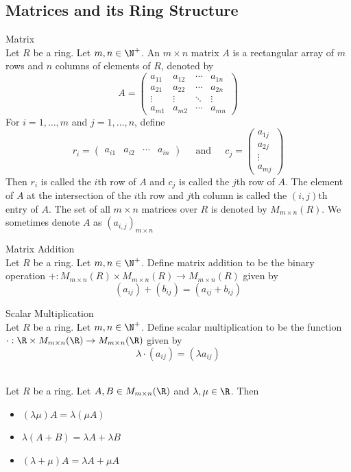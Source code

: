 \documentclass[a4paper]{article}
\begin{document}
\subsection{Matrices and its Ring Structure}
\begin{defn}{Matrix}{}\\
Let $R$ be a ring. Let $m,n\in\N^+$. An $m\times n$ matrix $A$ is a rectangular array of $m$ rows and $n$ columns of elements of $R$, denoted by $$A=
\begin{pmatrix}
a_{11}&a_{12}&\cdots&a_{1n}\\
a_{21}&a_{22}&\cdots&a_{2n}\\
\vdots&\vdots&\ddots&\vdots\\
a_{m1}&a_{m2}&\cdots&a_{mn}
\end{pmatrix}$$ For $i=1,\dots,m$ and $j=1,\dots,n$, define $$r_i=
\begin{pmatrix}
a_{i1}&a_{i2}&\cdots&a_{in}
\end{pmatrix}\;\;\;\;\text{ and }\;\;\;\;c_j=\begin{pmatrix}
a_{1j}\\
a_{2j}\\
\vdots\\
a_{mj}
\end{pmatrix}$$ Then $r_i$ is called the $i$th row of $A$ and $c_j$ is called the $j$th row of $A$. The element of $A$ at the intersection of the $i$th row and $j$th column is called the $(i,j)$th entry of $A$. The set of all $m\times n$ matrices over $R$ is denoted by $M_{m\times n}(R)$. We sometimes denote $A$ as $(a_{i,j})_{m\times n}$
\end{defn}

\begin{defn}{Matrix Addition}{}\\
Let $R$ be a ring. Let $m,n\in\N^+$. Define matrix addition to be the binary operation $+:M_{m\times n}(R)\times M_{m\times n}(R)\to M_{m\times n}(R)$ given by $$(a_{ij})+(b_{ij})=(a_{ij}+b_{ij})$$
\end{defn}

\begin{defn}{Scalar Multiplication}{}\\
Let $R$ be a ring. Let $m,n\in\N^+$. Define scalar multiplication to be the function $\cdot:\R\times M_{m\times n}(\R)\to M_{m\times n}(\R)$ given by $$\lambda\cdot(a_{ij})=(\lambda a_{ij})$$
\end{defn}

\begin{prp}{}{}\\
Let $R$ be a ring. Let $A,B\in M_{m\times n}(\R)$ and $\lambda,\mu\in\R$. Then
\begin{itemize}
\item $(\lambda\mu)A=\lambda(\mu A)$
\item $\lambda(A+B)=\lambda A+\lambda B$
\item $(\lambda+\mu)A=\lambda A+\mu A$
\end{itemize}
\end{prp}
\end{document}
